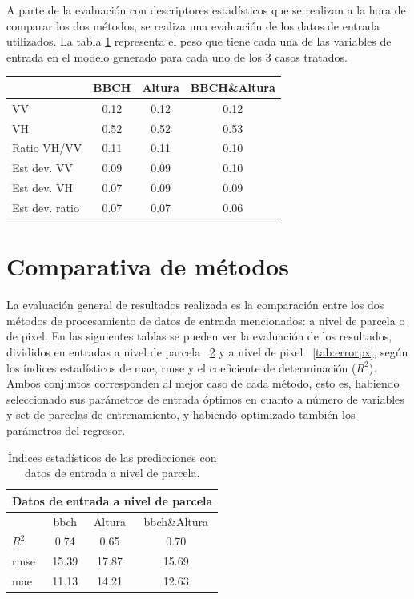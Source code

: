 \par A parte de la evaluación con descriptores estadísticos que se realizan a la hora de comparar los dos métodos, se realiza una evaluación de los datos de entrada utilizados. La tabla \ref{tab:p_imp_f} representa el peso que tiene cada una de las variables de entrada en el modelo generado para cada uno de los 3 casos tratados. 

\begin{table}[h] \label{tab:p_imp_f}
\begin{tabular}{l|ccc}
               & BBCH & Altura & BBCH\&Altura \\ \hline \hline
VV             & 0.12 & 0.12   & 0.12         \\
VH             & 0.52 & 0.52   & 0.53         \\
Ratio VH/VV    & 0.11 & 0.11   & 0.10         \\
Est dev. VV    & 0.09 & 0.09   & 0.10         \\
Est dev. VH    & 0.07 & 0.09   & 0.09         \\
Est dev. ratio & 0.07 & 0.07   & 0.06        
\end{tabular}
\end{table}
\section{Comparativa de métodos}
\par La evaluación general de resultados realizada es la comparación entre los dos métodos de procesamiento de datos de entrada mencionados: a nivel de parcela o de pixel. En las siguientes tablas se pueden ver la evaluación de los resultados, divididos en entradas a nivel de parcela ~\ref{tab:errorpc} y a nivel de pixel ~\ref{tab:errorpx}, según los índices estadísticos de \gls{mae}, \gls{rmse} y el coeficiente de determinación ($R^2$). Ambos conjuntos corresponden al mejor caso de cada método, esto es, habiendo seleccionado sus parámetros de entrada óptimos en cuanto a número de variables y set de parcelas de entrenamiento, y habiendo optimizado también los parámetros del regresor.

\begin{table}[h]
\centering
\begin{tabular}{lccc}
\multicolumn{4}{c}{Datos de entrada a nivel de parcela}                            \\ \hline \hline
\multicolumn{1}{l|}{}                            & \gls{bbch}  & Altura & \gls{bbch}\&Altura \\ \cline{2-4} 
\multicolumn{1}{l|}{$R^2$}                       & 0.74  & 0.65   & 0.70 \\
\multicolumn{1}{l|}{\gls{rmse}} 				 & 15.39 & 17.87  & 15.69 \\
\multicolumn{1}{l|}{\gls{mae}}  				 & 11.13 & 14.21  & 12.63       
\end{tabular}
\caption{Índices estadísticos de las predicciones con datos de entrada a nivel de parcela. \label{tab:errorpc}}
\end{table}

